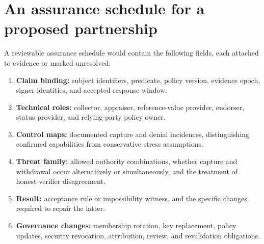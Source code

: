 \documentclass[11pt,letterpaper]{article}
\begin{document}
\section{An assurance schedule for a proposed partnership}
A reviewable assurance schedule would contain the following fields, each attached to evidence or marked unresolved:
\begin{enumerate}
\item \textbf{Claim binding:} subject identifiers, predicate, policy version, evidence epoch, signer identities, and accepted response window.
\item \textbf{Technical roles:} collector, appraiser, reference-value provider, endorser, status provider, and relying-party policy owner.
\item \textbf{Control maps:} documented capture and denial incidences, distinguishing confirmed capabilities from conservative stress assumptions.
\item \textbf{Threat family:} allowed authority combinations, whether capture and withdrawal occur alternatively or simultaneously, and the treatment of honest-verifier disagreement.
\item \textbf{Result:} acceptance rule or impossibility witness, and the specific changes required to repair the latter.
\item \textbf{Governance changes:} membership rotation, key replacement, policy updates, security revocation, attribution, review, and revalidation obligations.
\end{enumerate}
\end{document}
